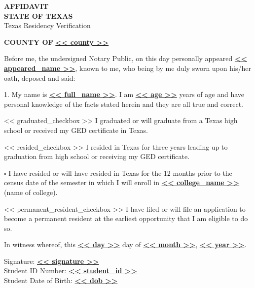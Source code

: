 \documentclass[12pt]{article}
\begin{document}
\begin{center}
    {\Large \textbf{AFFIDAVIT}}\\
    \textbf{STATE OF TEXAS}\\
    \small Texas Residency Verification
\end{center}

\vspace{1em}

\noindent \textbf{COUNTY OF} \underline{\textbf{<< county >>}}

\vspace{1em}

Before me, the undersigned Notary Public, on this day personally appeared
\underline{\textbf{<< appeared_name >>}}, known to me, who being by me duly sworn upon his/her oath, deposed and said:

\vspace{1em}

1. My name is \underline{\textbf{<< full_name >>}}. I am \underline{\textbf{<< age >>}} years of age and have personal knowledge of the facts stated herein and they are all true and correct.

\vspace{1em}

<< graduated_checkbox >> I graduated or will graduate from a Texas high school or received my GED certificate in Texas.

\vspace{0.5em}
<< resided_checkbox >> I resided in Texas for three years leading up to graduation from high school or receiving my GED certificate.

\vspace{0.5em}
$\square$ I have resided or will have resided in Texas for the 12 months prior to the census date of the semester in which I will enroll in \underline{\textbf{<< college_name >>}} (name of college).

\vspace{0.5em}
<< permanent_resident_checkbox >> I have filed or will file an application to become a permanent resident at the earliest opportunity that I am eligible to do so.

\vspace{1em}

In witness whereof, this \underline{\textbf{<< day >>}} day of
\underline{\textbf{<< month >>}}, \underline{\textbf{<< year >>}}.

\vspace{1em}

Signature: \underline{\textbf{<< signature >>}} \\
Student ID Number: \underline{\textbf{<< student_id >>}} \\
Student Date of Birth: \underline{\textbf{<< dob >>}}
\end{document}
